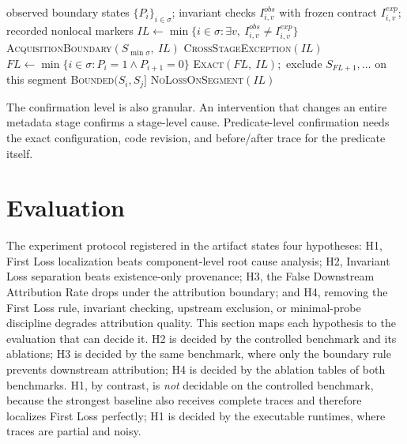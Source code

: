 \documentclass[10pt]{article}
\begin{document}
\begin{algorithm}[t]
\caption{FLM attribution on one observed lineage segment $\sigma$}
\label{alg:flm}
\begin{algorithmic}[1]
\Require observed boundary states $\{P_i\}_{i\in\sigma}$; invariant checks $I^{obs}_{i,v}$ with frozen contract $I^{exp}_{i,v}$; recorded nonlocal markers
\State $\mathit{IL}\gets\min\{i\in\sigma : \exists v,\ I^{obs}_{i,v}\neq I^{exp}_{i,v}\}$ 
  \State \Return \textsc{AcquisitionBoundary}$(S_{\min\sigma},\ \mathit{IL})$
\EndIf
{}
  \State \Return \textsc{CrossStageException}$(\mathit{IL})$
\EndIf
\State $\mathit{FL}\gets\min\{i\in\sigma : P_i=1 \land P_{i+1}=0\}$ 
  \State \Return \textsc{Exact}$(\mathit{FL},\ \mathit{IL})$;\ exclude $S_{\mathit{FL}+1},\ldots$ on this segment
  \State \Return \textsc{Bounded}$(S_i,S_j]$ 
\Else
  \State \Return \textsc{NoLossOnSegment}$(\mathit{IL})$
\EndIf
\end{algorithmic}
\end{algorithm}

The confirmation level is also granular. An intervention that changes an entire metadata stage confirms a stage-level cause. Predicate-level confirmation needs the exact configuration, code revision, and before/after trace for the predicate itself.

\section{Evaluation}

The experiment protocol registered in the artifact \cite{chen2026firstlossartifact} states four hypotheses: H1, First Loss localization beats component-level root cause analysis; H2, Invariant Loss separation beats existence-only provenance; H3, the False Downstream Attribution Rate drops under the attribution boundary; and H4, removing the First Loss rule, invariant checking, upstream exclusion, or minimal-probe discipline degrades attribution quality. This section maps each hypothesis to the evaluation that can decide it. H2 is decided by the controlled benchmark and its ablations; H3 is decided by the same benchmark, where only the boundary rule prevents downstream attribution; H4 is decided by the ablation tables of both benchmarks. H1, by contrast, is \emph{not} decidable on the controlled benchmark, because the strongest baseline also receives complete traces and therefore localizes First Loss perfectly; H1 is decided by the executable runtimes, where traces are partial and noisy.
\end{document}
